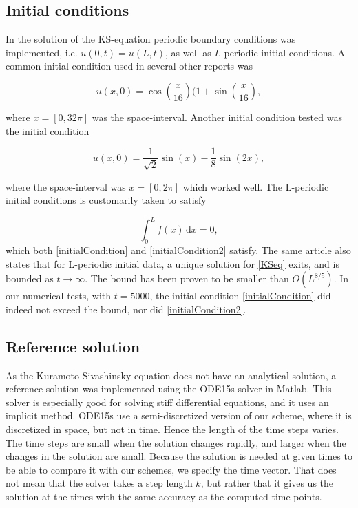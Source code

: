 \subsection{Initial conditions}
In the solution of the KS-equation periodic boundary conditions was implemented, i.e. $u(0,t) = u(L,t)$, as well as $L$-periodic initial conditions. A common initial condition used in several other reports was

\begin{equation}
\label{initialCondition}
u(x,0) = \cos(\frac{x}{16})(1 + \sin(\frac{x}{16}),
\end{equation}

where $x = [0, 32\pi]$ was the space-interval. Another initial condition tested was the initial condition

\begin{equation}
\label{initialCondition2}
u(x,0) = \frac{1}{\sqrt{2}} \sin(x) - \frac{1}{8}\sin(2x),
\end{equation}

where the space-interval was $x = [0, 2\pi]$ which worked well. The L-periodic initial conditions is customarily taken \cite{periodicInitial} to satisfy

\begin{equation}
\int_0^L\! f(x)\,\textrm{d}x = 0,
\end{equation}
which both \eqref{initialCondition} and \eqref{initialCondition2} satisfy. The same article also states that for L-periodic initial data, a unique solution for \eqref{KSeq} exits, and is bounded as $t\rightarrow\infty$. The bound has been proven to be smaller than $O(L^{8/5})$. In our numerical tests, with $t=5000$, the initial condition \eqref{initialCondition} did indeed not exceed the bound, nor did \eqref{initialCondition2}.

\subsection{Reference solution}
As the Kuramoto-Sivashinsky equation does not have an analytical solution, a reference solution was implemented using the ODE15s-solver in Matlab. This solver is especially good for solving stiff differential equations, and it uses an implicit method. ODE15s use a semi-discretized version of our scheme, where it is discretized in space, but not in time. Hence the length of the time steps varies. The time steps are small when the solution changes rapidly, and larger when the changes in the solution are small. Because the solution is needed at given times to be able to compare it with our schemes, we specify the time vector. That does not mean that the solver takes a step length $k$, but rather that it gives us the solution at the times with the same accuracy as the computed time points. \cite{ode15s}


